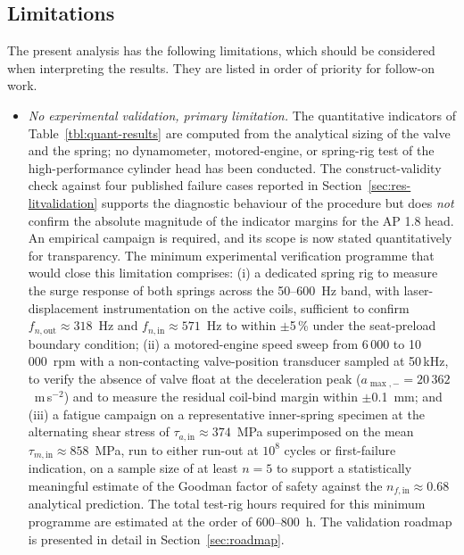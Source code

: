 \subsection{Limitations}\label{sec:disc-limitations}

The present analysis has the following limitations, which should be
considered when interpreting the results. They are listed in order
of priority for follow-on work.

\begin{itemize}
\item \emph{No experimental validation, primary limitation.} The
quantitative indicators of Table~\ref{tbl:quant-results} are
computed from the analytical sizing of the valve and the spring;
no dynamometer, motored-engine, or spring-rig test of the
high-performance cylinder head has been conducted. The construct-validity
check against four published failure cases reported in
Section~\ref{sec:res-litvalidation} supports the diagnostic
behaviour of the procedure but does \emph{not} confirm the absolute
magnitude of the indicator margins for the AP 1.8 head. An
empirical campaign is required, and its scope is now stated
quantitatively for transparency. The minimum experimental
verification programme that would close this limitation comprises:
(i) a dedicated spring rig to measure the surge response of both
springs across the 50--600~Hz band, with laser-displacement
instrumentation on the active coils, sufficient to confirm
$f_{n,\mathrm{out}}\approx 318$~Hz and
$f_{n,\mathrm{in}}\approx 571$~Hz to within $\pm$5\,\% under the
seat-preload boundary condition; (ii) a motored-engine speed sweep
from 6\,000 to 10\,000~rpm with a non-contacting valve-position
transducer sampled at 50\,kHz, to verify the absence of valve
float at the deceleration peak ($a_{\max,-}=20\,362$~m\,s$^{-2}$)
and to measure the residual coil-bind margin within $\pm$0.1~mm;
and (iii) a fatigue campaign on a representative inner-spring
specimen at the alternating shear stress of
$\tau_{a,\mathrm{in}}\approx 374$~MPa superimposed on the mean
$\tau_{m,\mathrm{in}}\approx 858$~MPa, run to either run-out at
$10^{8}$ cycles or first-failure indication, on a sample size of
at least $n=5$ to support a statistically meaningful estimate of
the Goodman factor of safety against the
$n_{f,\mathrm{in}}\approx 0.68$ analytical prediction. The total
test-rig hours required for this minimum programme are estimated
at the order of 600--800~h. The validation roadmap is presented in
detail in Section~\ref{sec:roadmap}.

\end{itemize}
